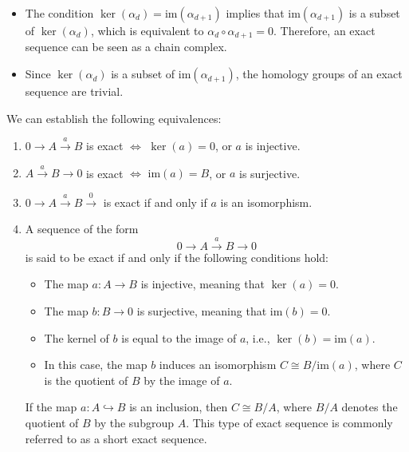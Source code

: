 \begin{remark}
\begin{itemize}
	\item The condition $\ker(\alpha_d) = \mathrm{im}(\alpha_{d+1})$ implies that $\mathrm{im}(\alpha_{d+1})$ is a subset of $\ker(\alpha_d)$, which is equivalent to $\alpha_d \circ \alpha_{d+1} = 0$. Therefore, an exact sequence can be seen as a chain complex.
	\item Since $\ker(\alpha_d)$ is a subset of $\mathrm{im}(\alpha_{d+1})$, the homology groups of an exact sequence are trivial.
\end{itemize}
\end{remark}

\begin{proposition}
We can establish the following equivalences:
\begin{enumerate}
	\item $0 \xrightarrow{} A \xrightarrow{a} B$ is exact $\Longleftrightarrow$ $\ker(a) = 0$, or $a$ is injective.
	\item $A \xrightarrow{a} B \rightarrow 0$ is exact $\Longleftrightarrow$ \(\mathrm{im}(a) = B\), or $a$ is surjective.
	\item $0 \xrightarrow{} A \xrightarrow{a} B \xrightarrow 0$ is exact if and only if $a$ is an isomorphism.
	\item A sequence of the form
	\begin{equation}
	0 \xrightarrow{} A \xrightarrow{a} B \xrightarrow{} 0
	\end{equation}
	is said to be exact if and only if the following conditions hold:
	\begin{itemize}
		\item The map $a: A \rightarrow B$ is injective, meaning that $\ker(a) = 0$.
		\item The map $b: B \rightarrow 0$ is surjective, meaning that \(\mathrm{im}(b) = 0\).
		\item The kernel of $b$ is equal to the image of $a$, i.e., $\ker(b) = \mathrm{im}(a)$.
		\item In this case, the map $b$ induces an isomorphism $C \cong B/\mathrm{im}(a)$, where $C$ is the quotient of $B$ by the image of $a$.
	\end{itemize}
	If the map $a: A \hookrightarrow B$ is an inclusion, then $C \cong B/A$, where $B/A$ denotes the quotient of $B$ by the subgroup $A$. This type of exact sequence is commonly referred to as a short exact sequence.
\end{enumerate}
\end{proposition}

